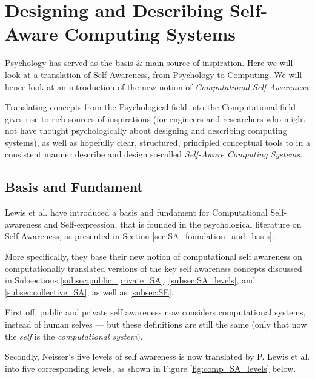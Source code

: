 \section{Designing and Describing Self-Aware Computing Systems}
\label{sec:design_describe_sa_comp_systems}

Psychology has served as the basis \& main source of inspiration. Here we will look at a translation of Self-Awareness, from Psychology to Computing. We will hence look at an introduction of the new notion of \textit{Computational Self-Awareness}.

Translating concepts from the Psychological field into the Computational field gives rise to rich sources of inspirations (for engineers and researchers who might not have thought psychologically about designing and describing computing systems), as well as hopefully clear, structured, principled conceptual tools to in a consistent manner describe and design so-called \textit{Self-Aware Computing Systems}.

	\subsection{Basis and Fundament}

	Lewis et al. \cite{sacs16_ch2} have introduced a basis and fundament for Computational Self-awareness and Self-expression, that is founded in the psychological literature on Self-Awareness, as presented in Section \ref{sec:SA_foundation_and_basis}.

	More specifically, they base their new notion of computational self awareness on computationally translated versions of the key self awareness concepts discussed in Subsections \ref{subsec:public_private_SA}, \ref{subsec:SA_levels}, and \ref{subsec:collective_SA}, as well as \ref{subsec:SE}.

	First off, public and private self awareness now considers computational systems, instead of human selves — but these definitions are still the same (only that now the \textit{self} is the \textit{computational system}).

	Secondly, Neisser's five levels of self awareness is now translated by P. Lewis et al. \cite{sacs16_ch2} into five corresponding levels, as shown in Figure \ref{fig:comp_SA_levels} below.

